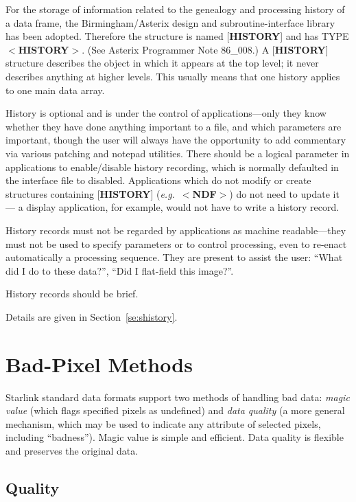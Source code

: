 \documentclass[twoside,11pt]{article}
\newcommand{\htmlref}[2]{#1}
\newcommand{\html}[1]{}
\newcommand{\latex}[1]{#1}
\newcommand{\xlabel}[1]{}
\begin{document}
For the storage of information related to the genealogy and
processing history of a data frame, the
Birmingham/Asterix design and subroutine-interface library
has been adopted.  Therefore the structure is named
{[}{\bf HISTORY}{]} and has TYPE $<${\bf HISTORY}$>$.  (See
Asterix Programmer Note 86\_008.)
A {[}{\bf HISTORY}{]} structure describes
the object in which it appears at the top level;
it never describes anything at higher levels.
This usually means that one history applies to one
main data array.

History is optional and is under the control of applications---only
they know whether they have done anything important to a file, and which
parameters are important, though the user will always
have the opportunity to add commentary via various patching
and notepad utilities.  There
should be a logical parameter in applications to enable/disable history
recording, which is normally defaulted in the interface file to
disabled.  Applications which do not modify or create structures containing
{[}{\bf HISTORY}{]} ({\it e.g.}\ 
$<${\bf NDF}$>$) do not need to update it ---
a display
application, for example, would not have to write a history
record.

History records must not be regarded by applications as
machine readable---they must not be used to specify parameters
or to control processing, even to re-enact automatically
a processing sequence.  They are present to assist the user:
``What did I do to these data?'', ``Did I flat-field this image?''.

History records should be brief.

Details are given in \latex{Section~\ref{se:shistory}.}\html{\htmlref{$<${\bf HISTORY}$>$
Structure.}{se:history}}

\section{\xlabel{se_badpixel}Bad-Pixel Methods\label{se:badpixel}}

Starlink standard data formats support two
methods of handling bad data: {\it magic value} (which
flags specified pixels as undefined)
and {\it data quality} (a more general mechanism, which may
be used to indicate any attribute of selected pixels, including
``badness'').  Magic value is simple
and efficient.  Data quality
is flexible and preserves the original data.

\subsection{\xlabel{se_quality}Quality\label{se:quality}}
\end{document}
